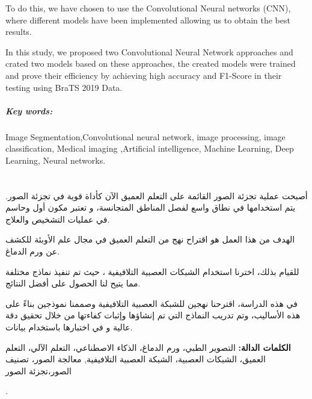 To do this, we have chosen to use the Convolutional Neural networks (CNN), where different models have been implemented allowing us to obtain the best results.\newline

In this study, we proposed two Convolutional Neural Network approaches and crated two models based on these approaches, the created models were trained and prove their efficiency by achieving high accuracy and F1-Score in their testing using BraTS 2019 Data.
\paragraph{Key words:}
Image Segmentation,Convolutional neural network, image processing, image classification, Medical imaging ,Artificial intelligence, Machine Learning, Deep Learning, Neural networks.

\newpage

\chapter*{{}}
\rhead{}

\vspace{10pt}
\begin{RLtext}
أصبحت عملية تجزئة الصور القائمة على التعلم العميق الآن كأداة قوية في تجزئة الصور. يتم استخدامها في نطاق واسع لفصل المناطق المتجانسة، و تعتبر مكون أول وحاسم في عمليات  التشخيص والعلاج.

\vspace{10pt}
الهدف من هذا العمل هو اقتراح نهج من التعلم العميق في مجال علم الأوبئة للكشف عن ورم الدماغ.

\vspace{10pt}
للقيام بذلك، اخترنا استخدام الشبكات العصبية التلافيفية ، حيث تم تنفيذ نماذج مختلفة مما يتيح لنا الحصول على أفضل النتائج. 

\vspace{10pt}
في هذه الدراسة، اقترحنا نهجين للشبكة العصبية التلافيفية وصممنا نموذجين بناءً على هذه الأساليب، وتم تدريب النماذج التي تم إنشاؤها وإثبات كفاءتها من خلال تحقيق دقة عالية و في اختبارها باستخدام بيانات.

\vspace{10pt}

\end{RLtext}

\begin{RLtext}
\textbf{الكلمات الدالة:}
التصوير
 الطبي، ورم الدماغ، الذكاء الاصطناعي، التعلم الآلي، التعلم العميق، الشبكات العصبية، الشبكة العصبية التلافيفية, معالجة الصور، تصنيف الصور،تجزئة الصور
 
 .
 
\end{RLtext}
